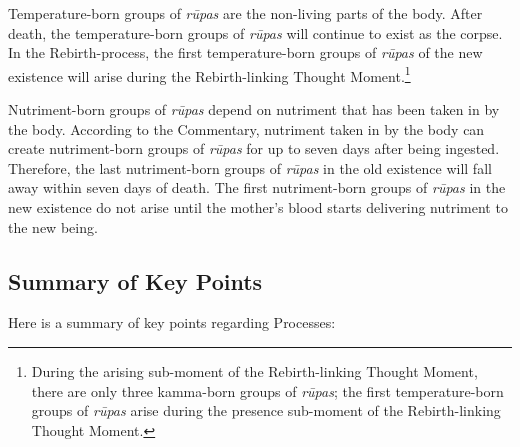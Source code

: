 Temperature-born groups of \textit{rūpas} are the non-living parts of the body. After death, the temperature-born groups of \textit{rūpas} will continue to exist as the corpse. In the Rebirth-process, the first temperature-born groups of \textit{rūpas} of the new existence will arise during the Rebirth-linking Thought Moment.\footnote{During the arising sub-moment of the Rebirth-linking Thought Moment, there are only three kamma-born groups of \textit{rūpas}; the first temperature-born groups of \textit{rūpas} arise during the presence sub-moment of the Rebirth-linking Thought Moment.}

Nutriment-born groups of \textit{rūpas} depend on nutriment that has been taken in by the body. According to the Commentary, nutriment taken in by the body can create nutriment-born groups of \textit{rūpas} for up to seven days after being ingested. Therefore, the last nutriment-born groups of \textit{rūpas} in the old existence will fall away within seven days of death. The first nutriment-born groups of \textit{rūpas} in the new existence do not arise until the mother’s blood starts delivering nutriment to the new being.

\subsection*{Summary of Key Points}

Here is a summary of key points regarding Processes:

